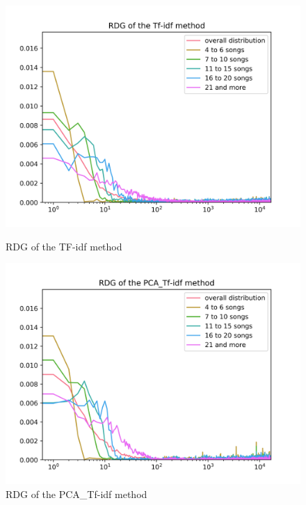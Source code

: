 \begin{figure}[h]
\centering
\begin{minipage}{.45\textwidth}
  \centering
  \includegraphics[width=1\linewidth]{./img/tf_idf_graph.png}
  \caption{RDG of the TF-idf method}
  \label{fig:tf_idf_distribution}
\end{minipage}%
 \vspace{1cm}
\begin{minipage}{.45\textwidth}
  \centering
  \includegraphics[width=1\linewidth]{./img/pca_tf_idf_graph.png}
  \caption{RDG of the PCA\_Tf-idf method}
  \label{fig:pca_tf_idf_distribution}
\end{minipage}
\end{figure}


